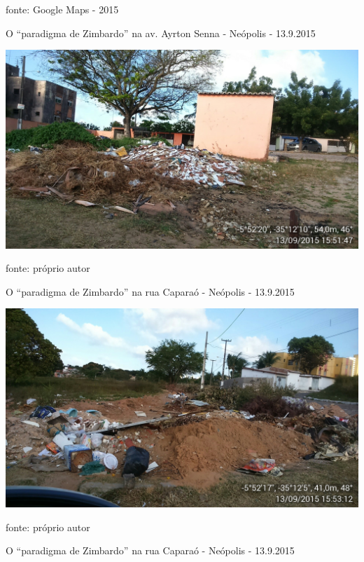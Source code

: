 \documentclass[
	12pt,				%
	openright,			%
	twoside,			%
	a4paper,			%
	chapter=TITLE,		%
	section=TITLE,		%
	subsection=TITLE,	%
	subsubsection=TITLE,%
	spanish,            %
	english,			%
	brazil				%
	]{abntex2}
\begin{document}
\begin{anexosenv}
\begin{mapa}[!htpb]
	\ABNTEXchapterfont\small{fonte: Google Maps - 2015}
\end{mapa}
\newpage
\begin{foto}[!htpb]
	\caption{\label{FotoA}O “paradigma de Zimbardo” na av. Ayrton Senna - Neópolis - 13.9.2015}
	\begin{center}
		\includegraphics[scale=0.23]{ayrton_senna.png}
	\end{center}
	\ABNTEXchapterfont\small{fonte: próprio autor}
\end{foto}
\begin{foto}[!htpb]
	\caption{\label{FotoB}O “paradigma de Zimbardo” na rua Caparaó - Neópolis - 13.9.2015}
	\begin{center}
		\includegraphics[scale=0.23]{abaete1.jpg}
	\end{center}
	\ABNTEXchapterfont\small{fonte: próprio autor}
\end{foto}
\begin{foto}[!htpb]
	\caption{\label{FotoC}O “paradigma de Zimbardo” na rua Caparaó - Neópolis - 13.9.2015}
	\begin{center}

\end{center}
\end{foto}
\end{anexosenv}
\end{document}

